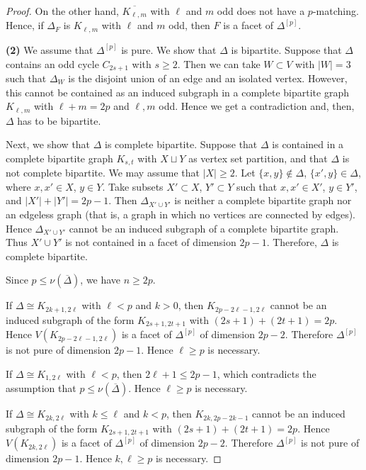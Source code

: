 \documentclass[12pt]{amsart}
\begin{document}
\begin{proof}
On the other hand, $\overline{K_{\ell,m}}$ with $\ell$ and $m$ odd does not have a $p$-matching. Hence, if $\Delta_F$ is $K_{\ell,m}$ with $\ell$ and $m$ odd, then $F$ is a facet of $\Delta^{[p]}$.

\textbf{(2)}
We assume that $\Delta^{[p]}$ is pure.
We show that $\Delta$ is bipartite.
Suppose that $\Delta$ contains an odd cycle $C_{2s+1}$ with $s \ge 2$.
Then we can take $W \subset V$ with $|W| = 3$ such that $\Delta_W$ is the disjoint union of
an edge and an isolated vertex. However, this cannot be contained as an induced subgraph in a complete bipartite graph $K_{\ell,m}$ with $\ell + m = 2p$ and $\ell, m$ odd. Hence we get a contradiction and, then, $\Delta$ has to be bipartite.

Next, we show that $\Delta$ is complete bipartite.
Suppose that $\Delta$ is contained in a complete bipartite graph $K_{s,t}$ with
$X \sqcup Y$ as vertex set partition, and that $\Delta$ is not complete bipartite.
We may assume that $|X| \ge 2$. Let $\{x, y\} \notin \Delta$, $\{x', y\} \in \Delta$, where $x, x' \in X$, $y \in Y$.
Take subsets $X' \subset X$, $Y' \subset Y$ such that $x, x' \in X'$, $y \in Y'$, and $|X'| + |Y'| = 2p-1$.
Then $\Delta_{X' \cup Y'}$ is neither a complete bipartite graph nor an edgeless graph (that is, a graph in which no vertices are connected by edges). Hence $\Delta_{X' \cup Y'}$ cannot be an induced subgraph of a complete bipartite graph.
Thus $X' \cup Y'$ is not contained in a facet of dimension $2p-1$.
Therefore, $\Delta$ is complete bipartite.

Since $p \leq \nu(\overline{\Delta})$, we have $n \ge 2p$.

If $\Delta \cong K_{2k+1,2\ell}$ with $\ell < p$ and $k > 0$, then 
$K_{2p-2\ell-1,2\ell}$ cannot be an induced subgraph of the form 
$K_{2s+1, 2t+1}$ with $(2s+1) + (2t+1) = 2p$.
Hence $V(K_{2p-2\ell-1,2\ell})$ is a facet of $\Delta^{[p]}$ of dimension $2p-2$. Therefore $\Delta^{[p]}$ is not pure of dimension $2p-1$.
Hence $\ell \ge p$ is necessary.

If $\Delta \cong K_{1,2\ell}$ with $\ell < p$, then $2\ell + 1 \le 2p-1$,
which contradicts the assumption that $p \leq \nu(\overline{\Delta})$.
Hence $\ell \ge p$ is necessary.

If $\Delta \cong K_{2k,2\ell}$ with $k \le \ell$ and $k < p$,
then $K_{2k,2p-2k-1}$ cannot be an induced subgraph of the form 
$K_{2s+1, 2t+1}$ with $(2s+1) + (2t+1) = 2p$.
Hence $V(K_{2k,2\ell})$ is a facet of $\Delta^{[p]}$ of dimension $2p-2$. Therefore $\Delta^{[p]}$ is not pure of dimension $2p-1$.
Hence $k, \ell \ge p$ is necessary.


\end{proof}
\end{document}

